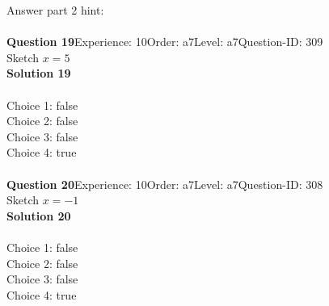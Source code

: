 \documentclass{article}
\begin{document}
Answer part 2 hint: \hspace{15pt}\\
\\[4pt]
\noindent\textbf{Question 19}\hspace{20pt}Experience: 10\hspace{20pt}Order: a7\hspace{20pt}Level: a7\hspace{20pt}Question-ID: 309\\[2pt]
Sketch $x=5$\\[4pt]
\noindent\textbf{Solution 19}\\[2pt]
\\[4pt]
Choice 1: \hspace{20pt} \hspace{20pt}false\\
Choice 2: \hspace{20pt} \hspace{20pt}false\\
Choice 3: \hspace{20pt} \hspace{20pt}false\\
Choice 4: \hspace{20pt} \hspace{20pt}true\\
\\[4pt]
\noindent\textbf{Question 20}\hspace{20pt}Experience: 10\hspace{20pt}Order: a7\hspace{20pt}Level: a7\hspace{20pt}Question-ID: 308\\[2pt]
Sketch $x=-1$\\[4pt]
\noindent\textbf{Solution 20}\\[2pt]
\\[4pt]
Choice 1: \hspace{20pt} \hspace{20pt}false\\
Choice 2: \hspace{20pt} \hspace{20pt}false\\
Choice 3: \hspace{20pt} \hspace{20pt}false\\
Choice 4: \hspace{20pt} \hspace{20pt}true\\
\\[4pt]
\end{document}
